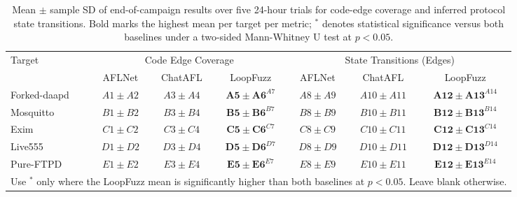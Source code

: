 
\begin{table}[htbp]
\centering
\caption{Mean $\pm$ sample SD of end-of-campaign results over five 24-hour trials for code-edge coverage and inferred protocol state transitions. Bold marks the highest mean per target per metric; $^*$ denotes statistical significance versus both baselines under a two-sided Mann-Whitney U test at $p < 0.05$.}
\setlength{\tabcolsep}{4pt}
\renewcommand{\arraystretch}{1.08}
\small
\begin{tabular}{l|ccc|ccc}
\toprule
\multirow{2}{*}{Target} & \multicolumn{3}{c|}{Code Edge Coverage} & \multicolumn{3}{c}{State Transitions (Edges)} \\
& AFLNet & ChatAFL & LoopFuzz & AFLNet & ChatAFL & LoopFuzz \\
\midrule
Forked-daapd & $A1 \pm A2$ & $A3 \pm A4$ & $\mathbf{A5 \pm A6}^{A7}$ & $A8 \pm A9$ & $A10 \pm A11$ & $\mathbf{A12 \pm A13}^{A14}$ \\
Mosquitto    & $B1 \pm B2$ & $B3 \pm B4$ & $\mathbf{B5 \pm B6}^{B7}$ & $B8 \pm B9$ & $B10 \pm B11$ & $\mathbf{B12 \pm B13}^{B14}$ \\
Exim         & $C1 \pm C2$ & $C3 \pm C4$ & $\mathbf{C5 \pm C6}^{C7}$ & $C8 \pm C9$ & $C10 \pm C11$ & $\mathbf{C12 \pm C13}^{C14}$ \\
Live555      & $D1 \pm D2$ & $D3 \pm D4$ & $\mathbf{D5 \pm D6}^{D7}$ & $D8 \pm D9$ & $D10 \pm D11$ & $\mathbf{D12 \pm D13}^{D14}$ \\
Pure-FTPD    & $E1 \pm E2$ & $E3 \pm E4$ & $\mathbf{E5 \pm E6}^{E7}$ & $E8 \pm E9$ & $E10 \pm E11$ & $\mathbf{E12 \pm E13}^{E14}$ \\
\bottomrule
\multicolumn{7}{l}{\footnotesize Use $^*$ only where the LoopFuzz mean is significantly higher than both baselines at $p < 0.05$. Leave blank otherwise.} \\
\end{tabular}
\normalsize
\label{tab:24h_results}
\end{table}


